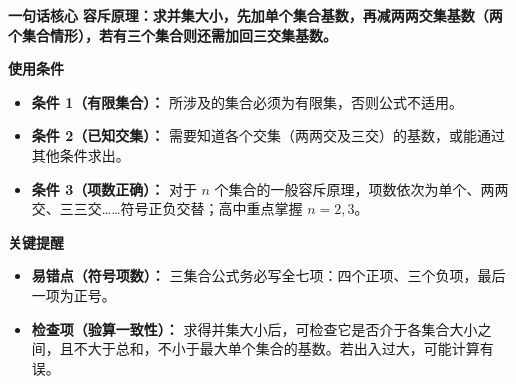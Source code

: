 \begin{summarybox}
	\textbf{\textcolor{CSummary}{一句话核心}}
	\textbf{容斥原理：求并集大小，先加单个集合基数，再减两两交集基数（两个集合情形），若有三个集合则还需加回三交集基数。}

	\medskip
	\textbf{\textcolor{CSummary}{使用条件}}
	\begin{itemize}[leftmargin=*, itemsep=0.5em, topsep=0.4em]
		\item \textbf{条件 1（有限集合）：} 所涉及的集合必须为有限集，否则公式不适用。
		\item \textbf{条件 2（已知交集）：} 需要知道各个交集（两两交及三交）的基数，或能通过其他条件求出。
		\item \textbf{条件 3（项数正确）：} 对于 $n$ 个集合的一般容斥原理，项数依次为单个、两两交、三三交……符号正负交替；高中重点掌握 $n=2,3$。
	\end{itemize}

	\medskip
	\textbf{\textcolor{CSummary}{关键提醒}}
	\begin{itemize}[leftmargin=*, itemsep=0.5em, topsep=0.4em]
		\item \textbf{易错点（符号项数）：} 三集合公式务必写全七项：四个正项、三个负项，最后一项为正号。
		\item \textbf{检查项（验算一致性）：} 求得并集大小后，可检查它是否介于各集合大小之间，且不大于总和，不小于最大单个集合的基数。若出入过大，可能计算有误。
	\end{itemize}

\end{summarybox}
